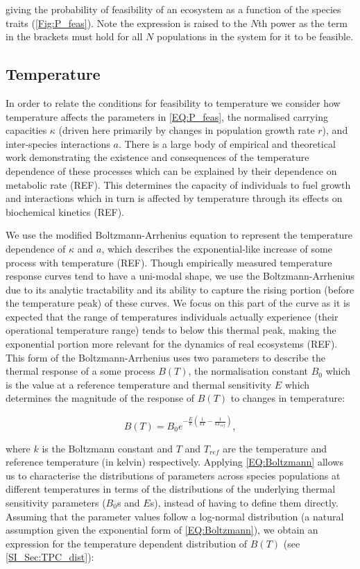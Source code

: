 \documentclass{article}
\begin{document}
giving the probability of feasibility of an ecosystem as a function of the species traits (\cref{Fig:P_feas}). Note the expression is raised to the $N$th power as the term in the brackets must hold for all $N$ populations in the system for it to be feasible. 

\subsection{Temperature} \label{SEC:Temperature}
In order to relate the conditions for feasibility to temperature we consider how temperature affects the parameters in \cref{EQ:P_feas}, the normalised carrying capacities $\kappa$ (driven here primarily by changes in population growth rate $r$), and inter-species interactions $a$. There is a large body of empirical and theoretical work demonstrating the existence and consequences of the temperature dependence of these processes which can be explained by their dependence on metabolic rate (REF). This determines the capacity of individuals to fuel growth and interactions which in turn is affected by temperature through its effects on biochemical kinetics (REF).

We use the modified Boltzmann-Arrhenius equation to represent the temperature dependence of $\kappa$ and $a$, which describes the exponential-like increase of some process with temperature (REF). Though empirically measured temperature response curves tend to have a uni-modal shape, we use the Boltzmann-Arrhenius due to its analytic tractability and its ability to capture the rising portion (before the temperature peak) of these curves. We focus on this part of the curve as it is expected that the range of temperatures individuals actually experience (their operational temperature range) tends to below this thermal peak, making the exponential portion more relevant for the dynamics of real ecosystems (REF). This form of the Boltzmann-Arrhenius uses two parameters to describe the thermal response of a some process $B(T)$, the normalisation constant $B_0$ which is the value at a reference temperature and thermal sensitivity $E$ which determines the magnitude of the response of $B(T)$ to changes in temperature:

\begin{equation} \label{EQ:Boltzmann}
    B(T) = B_0 e^{-\frac{E}{k} \left(\frac{1}{kT} - \frac{1}{k T_{ref} }\right)},
\end{equation}

where $k$ is the Boltzmann constant and $T$ and $T_{ref}$ are the temperature and reference temperature (in kelvin) respectively. Applying \cref{EQ:Boltzmann} allows us to characterise the distributions of parameters across species populations at different temperatures in terms of the distributions of the underlying thermal sensitivity parameters ($B_0$s and $E$s), instead of having to define them directly. Assuming that the parameter values follow a log-normal distribution (a natural assumption given the exponential form of \cref{EQ:Boltzmann}), we obtain an expression for the temperature dependent distribution of $B(T)$ (see \cref{SI_Sec:TPC_dist}):
\end{document}
